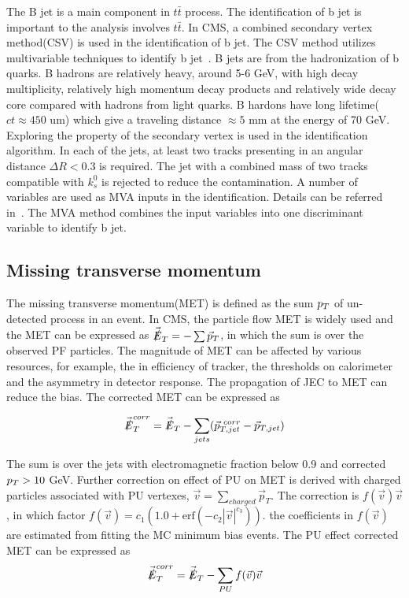 The B jet is a main component in $t\bar{t}$ process. The identification of b jet is important to the analysis involves $t\bar{t}$. In CMS,  a combined secondary vertex method(CSV) is used in the identification of b jet. The CSV method utilizes multivariable techniques to identify b jet~\cite{BTV-16-002}. B jets are from the hadronization of b quarks. B hadrons are relatively heavy, around 5-6 GeV, with high decay multiplicity, relatively high momentum decay products and relatively wide decay core compared with hadrons from light quarks. B hardons have long lifetime($ct\approx450$ um) which give a traveling distance $\approx5$ mm at the energy of 70 GeV. Exploring the property of the secondary vertex is used in the identification algorithm. In each of the jets, at least two tracks presenting in an angular distance $\Delta R <0.3$ is required. The jet with a combined mass of two tracks compatible with $k_{s}^{0}$ is rejected to reduce the contamination. A number of variables are used as MVA inputs in the identification. Details can be referred in~\cite{BTV-16-002}.  The MVA method combines the input variables into one discriminant variable to identify b jet.



\subsection{Missing transverse momentum}
The missing transverse momentum(MET) is defined as the sum $p_{T}$ of un-detected process in an event. In CMS, the particle flow MET is widely used and the MET can be expressed as $\vec{\slashed{E}}_{T}=-\sum \vec{p}_{T}$, in which the sum is over the observed PF particles. The magnitude of MET can be affected by various resources, for example, the in efficiency of tracker, the thresholds on calorimeter and the asymmetry in detector response. The propagation of JEC to MET can reduce the bias. The corrected MET can be expressed as
  
\begin{align*}
\vec{\slashed{E}}_{T}^{corr}=\vec{\slashed{E}}_{T}-\sum_{jets}(\vec{p}_{T,jet}^{~corr}-\vec{p}_{T,jet})
\end{align*}

The sum is over the jets with electromagnetic fraction below 0.9 and corrected $p_{T}>10$ GeV. Further correction on effect of PU on MET is derived with charged particles associated with PU vertexes, $\vec{v}=\sum_{charged}\vec{p}_{T}$. The correction is $f(\vec{v})\vec{v}$, in which factor $f(\vec{v})=c_{1}(1.0+\textrm{erf}(-c_{2}|\vec{v}|^{c_{3}}))$. the coefficients in $f(\vec{v})$ are estimated from fitting the MC minimum bias events. The PU effect corrected MET can be expressed as 
\begin{align*}
\vec{\slashed{E}}_{T}^{corr}=\vec{\slashed{E}}_{T}-\sum_{PU}f(\vec{v})\vec{v}
\end{align*}

